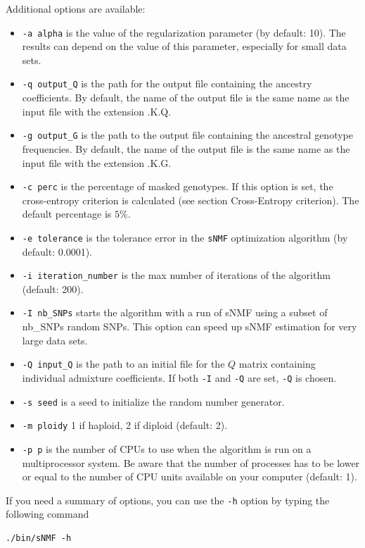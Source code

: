 \documentclass[10pt,a4paper]{article}
\begin{document}
\noindent
Additional options are available:
\begin{itemize}
\item \verb|-a alpha| is the value of the regularization parameter (by default: 10). The results can depend on the value of this parameter, especially for small data sets. 
\item \verb|-q output_Q| is the path for the output file containing the ancestry coefficients. By default, the name of the output file is the same name as the input file with the extension .K.Q.
\item \verb|-g output_G| is the path to the output file containing the ancestral genotype frequencies. By default, the name of the output file is the same name as the input file with the extension .K.G.
\item \verb|-c perc| is the percentage of masked genotypes. If this option is set, the cross-entropy criterion is calculated (see section Cross-Entropy criterion). The default percentage is $5\%$.
\item \verb|-e tolerance| is the tolerance error in the {\tt sNMF} optimization algorithm (by default: 0.0001). 
\item \verb|-i iteration_number| is the max number of iterations of the algorithm (default: 200). 
\item \verb|-I nb_SNPs| starts the algorithm with a run of sNMF using a subset of nb\_SNPs random SNPs. This option can speed up sNMF estimation for very large data sets.
\item \verb|-Q input_Q| is the path to an initial file for the $Q$ matrix containing individual admixture coefficients. If both \verb|-I| and \verb|-Q| are set, \verb|-Q| is chosen.
\item \verb|-s seed| is a seed to initialize the random number generator. 
\item \verb|-m ploidy|  1 if haploid, 2 if diploid (default: 2). 
\item \verb|-p p| is the number of CPUs to use when the algorithm is run on a multiprocessor system.
Be aware that the number of processes has to be lower or equal to the number 
of CPU units available on your computer (default: 1).
\end{itemize}


\noindent
If you need a summary of options, you can use the \verb|-h| option by typing the following command
\footnotesize
\begin{Verbatim}[frame=single]
./bin/sNMF -h
\end{Verbatim}
\noindent
\normalsize
\end{document}

